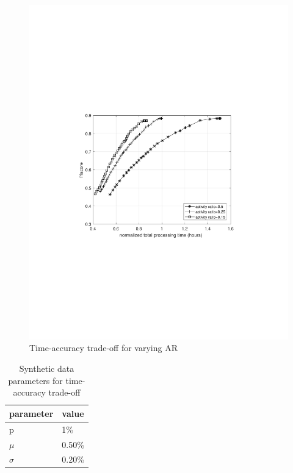 \begin{figure}
    \centering
    \includegraphics[width=\linewidth,trim={100 240 100 250},clip]{images/time-acc-tradeoff-ar-mog}
    \caption{Time-accuracy trade-off for varying AR}
    \label{fig:time-acc-tradeoff-ar-mog}
\end{figure}

\begin{table}
\centering
\caption{Synthetic data parameters for time-accuracy trade-off} \vspace{5pt}
\label{table:fig1_data_params}
\begin{tabular}{|l|l|}
\hline
parameter             & value  \\ \hline \hline
p                     & 1\%    \\ \hline
$\mu$    & 0.50\% \\ \hline
$\sigma$ & 0.20\% \\ \hline
\end{tabular}
\end{table}

